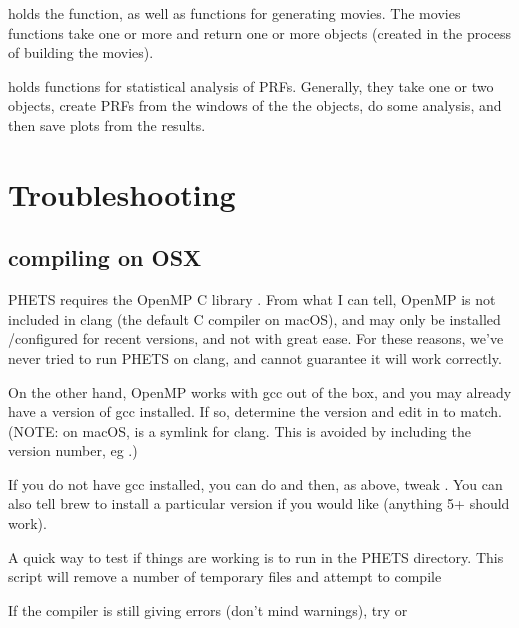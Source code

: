 \documentclass[letterpaper,10pt,openany,oneside,english]{sphinxmanual}
\begin{document}
 holds the  function, as well as functions for generating
movies. The movies functions take one or more  and return one or
more  objects (created in the process of building the movies).

 holds functions for statistical analysis of PRFs. Generally, they
take one or two  objects, create PRFs from the windows of the the
 objects, do some analysis, and then save plots from the results.


\chapter{Troubleshooting}
\label{\detokenize{index:troubleshooting}}

\section{compiling  on OSX}
\label{\detokenize{index:compiling-find-landmarks-c-on-osx}}
PHETS requires the OpenMP C library . From what I can tell, OpenMP
is not included in clang (the default C compiler on macOS), and may only be
installed /configured for recent versions, and not with great ease. For these reasons, we’ve
never tried to run PHETS on clang, and cannot guarantee it will work
correctly.

On the other hand, OpenMP works with gcc out of the box, and you
may already have a version of gcc installed. If so, determine the version and edit
 in  to match. (NOTE: on macOS,
 is a symlink for clang. This is avoided by including the version number,
eg .)

If you do not have gcc installed, you can do 
and then, as above, tweak . You can also tell brew to install a
particular version if you would like (anything 5+ should work).

A quick way to test if things are working is to run  in
the PHETS directory. This script will remove a number of temporary files and
attempt to compile 

If the compiler is still giving errors (don’t mind warnings), try
 or 
\end{document}
